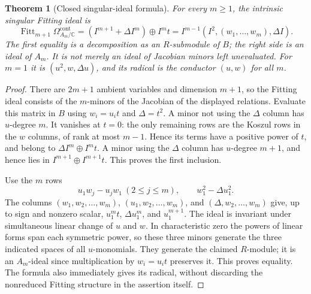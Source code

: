 \documentclass[11pt,reqno]{amsart}
\numberwithin{equation}{section}
\newtheorem{theorem}{Theorem}[section]
\theoremstyle{definition}\newtheorem{definition}[theorem]{Definition}
\theoremstyle{remark}\newtheorem{remark}[theorem]{Remark}
\newcommand{\C}{\mathbb C}\newcommand{\Q}{\mathbb Q}
\DeclareMathOperator{\Fitt}{Fitt}\DeclareMathOperator{\Ann}{Ann}
\begin{document}
\begin{theorem}[Closed singular-ideal formula]\label{thm:fitting-v153}
For every $m\geq1$, the intrinsic singular Fitting ideal is
\begin{equation}\label{eq:fitting-v153}
 \Fitt_{m+1}\Omega^{\mathrm{cont}}_{A_m/\C}
  =(I^{m+1}+\Delta I^m)\oplus I^m t
  = I^{m-1}(I^2,(w_1,\ldots,w_m),\Delta I).
\end{equation}
The first equality is a decomposition as an $R$-submodule of $B$;
the right side is an ideal of $A_m$. It is not merely an ideal of
Jacobian minors left unevaluated. For $m=1$ it is
$(u^2,w,\Delta u)$, and its radical is the conductor $(u,w)$ for
all $m$.
\end{theorem}
\begin{proof}
There are $2m+1$ ambient variables and dimension $m+1$, so the Fitting
ideal consists of the $m$-minors of the Jacobian of the displayed
relations. Evaluate this matrix in $B$ using $w_i=u_it$ and
$\Delta=t^2$. A minor not using the $\Delta$ column has $u$-degree
$m$. It vanishes at $t=0$: the only remaining rows are the Koszul
rows in the $w$ columns, of rank at most $m-1$. Hence its terms have
a positive power of $t$, and belong to $\Delta I^m\oplus I^m t$.
A minor using the $\Delta$ column has $u$-degree $m+1$, and hence
lies in $I^{m+1}\oplus I^{m+1}t$. This proves the first inclusion.

Use the $m$ rows
\[
 u_1w_j-u_jw_1\ (2\leq j\leq m),\qquad w_1^2-\Delta u_1^2.
\]
The columns $(w_1,w_2,\ldots,w_m)$, $(u_1,w_2,\ldots,w_m)$,
and $(\Delta,w_2,\ldots,w_m)$ give, up to sign and nonzero scalar,
$u_1^m t$, $\Delta u_1^m$, and $u_1^{m+1}$. The ideal is invariant
under simultaneous linear change of $u$ and $w$. In characteristic
zero the powers of linear forms span each symmetric power, so these
three minors generate the three indicated spaces of all $u$-monomials.
They generate the claimed $R$-module; it is an $A_m$-ideal since
multiplication by $w_i=u_it$ preserves it. This proves equality.
The formula also immediately gives its radical, without discarding
the nonreduced Fitting structure in the assertion itself.
\end{proof}
\end{document}
